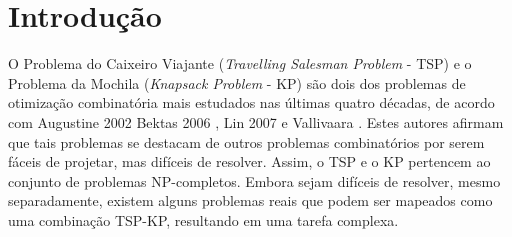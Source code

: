 \chapter{Introdução}








O Problema do Caixeiro Viajante (\textit{Travelling Salesman Problem} - TSP) e o Problema da Mochila (\textit{Knapsack Problem} - KP) são dois dos problemas de otimização combinatória mais estudados nas últimas quatro décadas, de acordo com Augustine 2002 \cite{augustine2002offline} Bektas 2006 \cite{bektas2006multiple}, Lin 2007 \cite{lin2008solving} e Vallivaara \cite{vallivaara2008team}. Estes autores afirmam que tais problemas se destacam de outros problemas combinatórios por serem fáceis de projetar, mas difíceis de resolver. Assim, o TSP e o KP pertencem ao conjunto de problemas NP-completos. Embora sejam difíceis de resolver, mesmo separadamente, existem alguns problemas reais que podem ser mapeados como uma combinação TSP-KP, resultando em uma tarefa complexa.

